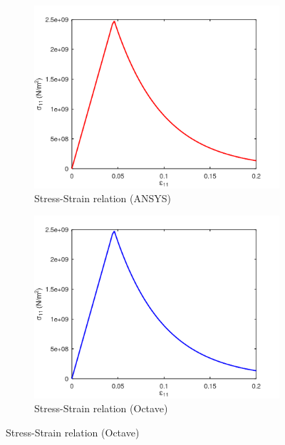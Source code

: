 \documentclass[a4paper,12pt]{extarticle}
\begin{document}
\begin{figure}[htbp]
     \centering
     \captionsetup[subfigure]{justification=centering}
     \begin{subfigure}{0.4\textwidth}
         \centering
         \includegraphics[width=1.25\textwidth]{22.StressvsStrain_Ansys.png}
         \caption{Stress-Strain relation (ANSYS)}
         \label{fig:Stress-Strain relation in Ansys2}
     \end{subfigure}
     \hfill
     \begin{subfigure}{0.4\textwidth}
         \centering
         \includegraphics[width=1.25\textwidth]{22.StressvsStrain_Octave.png}
         \caption{Stress-Strain relation (Octave)}
         \label{fig:Stress-Strain relation Octave2}
     \end{subfigure}
\end{figure}
\end{document}
